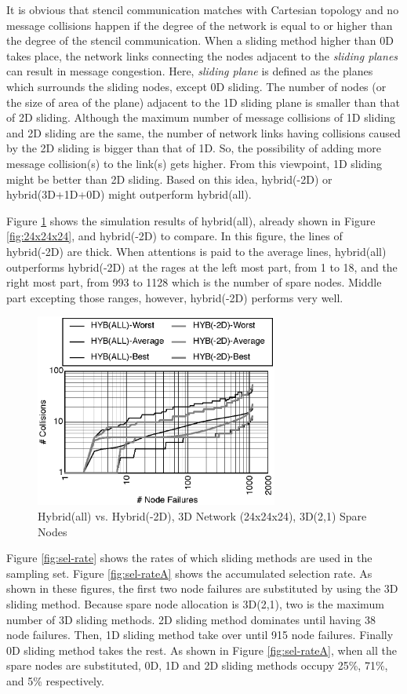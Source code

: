 \documentclass[Afour,times,sagev]{sagej}
\begin{document}
It is obvious that stencil communication matches with Cartesian
topology and no message collisions happen if the degree of the network
is equal to or higher than the 
degree of the stencil communication. When a sliding method higher than
0D takes place, the network links connecting the nodes adjacent to the
{\it sliding planes} can result in message congestion. Here, {\it
  sliding plane} is defined as the planes which surrounds the sliding
nodes, except 0D sliding. The number of nodes (or the size of area of
the plane) adjacent to the 1D sliding plane is smaller than that of 2D 
sliding. Although the maximum number of message collisions of 1D
sliding and 2D sliding are the same, the number of network links
having collisions caused by the 2D sliding is bigger than that of
1D. So, the possibility of adding more message collision(s) to the
link(s) gets higher. From this viewpoint, 1D sliding might be better
than 2D sliding. Based on this idea, hybrid(-2D) or hybrid(3D+1D+0D)
might outperform hybrid(all). 

Figure \ref{fig:24x24x24-hyb-2d} shows the simulation results of
hybrid(all), already shown in Figure \ref{fig:24x24x24}, and
hybrid(-2D) to compare. In this figure, the lines of hybrid(-2D) 
are thick. When attentions is paid to the average lines, hybrid(all)
outperforms hybrid(-2D) at the rages at the left most part, from 1 to
18, and the right most part, from 993 to 1128 which is the number of
spare nodes. Middle part excepting those ranges, however, hybrid(-2D)
performs very well. 

\begin{figure}[ht]
\centering
\includegraphics[width=80mm]{Figs/24x24x24-HYB310.eps}
  \caption{Hybrid(all) vs. Hybrid(-2D), 3D Network
    (24x24x24), 3D(2,1) Spare Nodes}
  \label{fig:24x24x24-hyb-2d}
\end{figure}

Figure \ref{fig:sel-rate} shows the rates of which sliding methods are
used in the sampling set. Figure \ref{fig:sel-rateA} shows the
accumulated selection rate. As shown in these figures, the first two 
node failures are substituted by using the 3D sliding method. Because
spare node allocation is 3D(2,1), two is the maximum number of 3D
sliding methods. 2D sliding method dominates until having 38 node
failures. Then, 1D sliding method take over until 915 node
failures. Finally 0D sliding method takes the rest. As shown in Figure
\ref{fig:sel-rateA}, when all the spare nodes are substituted, 0D, 1D
and 2D sliding methods occupy 25\%, 71\%, and 5\% respectively. 
\end{document}
